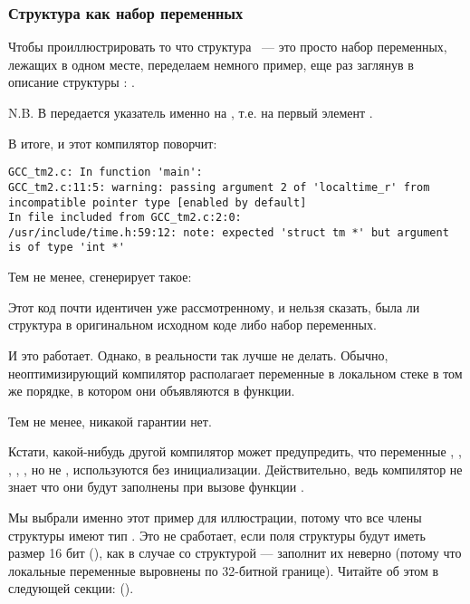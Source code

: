 ﻿\subsubsection{Структура как набор переменных}

Чтобы проиллюстрировать то что структура ~--- это просто набор переменных, лежащих в одном месте, 
переделаем немного пример, еще раз заглянув в описание структуры : .



N.B. В  передается указатель именно на , 
т.е. на первый элемент .

В итоге, и этот компилятор поворчит:

\begin{lstlisting}[caption=GCC 4.7.3]
GCC_tm2.c: In function 'main':
GCC_tm2.c:11:5: warning: passing argument 2 of 'localtime_r' from incompatible pointer type [enabled by default]
In file included from GCC_tm2.c:2:0:
/usr/include/time.h:59:12: note: expected 'struct tm *' but argument is of type 'int *'
\end{lstlisting}

Тем не менее, сгенерирует такое:



Этот код почти идентичен уже рассмотренному, и нельзя сказать, была ли структура
в оригинальном исходном коде либо набор переменных.

И это работает. 
Однако, в реальности так лучше не делать. 
Обычно, неоптимизирующий компилятор располагает переменные в локальном
стеке в том же порядке, в котором они объявляются в функции.

Тем не менее, никакой гарантии нет.

Кстати, какой-нибудь другой компилятор может предупредить, что переменные , , ,
, , но не , используются без инициализации.
Действительно, ведь компилятор не знает что они будут заполнены при вызове функции
.

Мы выбрали именно этот пример для иллюстрации, потому что все члены структуры имеют тип \Tint.
Это не сработает, если поля структуры будут иметь размер 16 бит (), как в случае
со структурой  ---  
заполнит их неверно 
(потому что локальные переменные выровнены по 32-битной границе).
Читайте об этом в следующей секции: 
\q{\StructurePackingSectionName} ().

